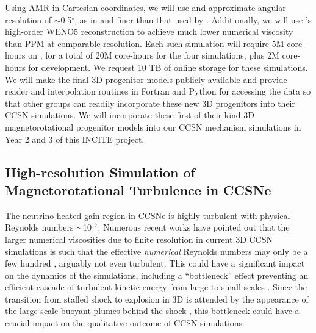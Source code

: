 Using AMR in Cartesian coordinates, we will use and approximate angular resolution of $\sim$0.5$^\circ$, as in \citep{Couch:2015a} and finer than that used by \citep{Muller:2017}.
Additionally, we will use \spark's high-order WENO5 reconstruction to achieve much lower numerical viscosity than PPM at comparable resolution.
Each such simulation will require 5M core-hours on \mira, for a total of 20M core-hours for the four simulations, plus 2M core-hours for development.
We request 10 TB of online storage for these simulations.
We will make the final 3D progenitor models publicly available and provide reader and interpolation routines in Fortran and Python for accessing the data so that other groups can readily incorporate these new 3D progenitors into their CCSN simulations.
We will incorporate these first-of-their-kind 3D magnetorotational progenitor models into our CCSN mechanism simulations in Year 2 and 3 of this INCITE project.

\subsection{High-resolution Simulation of Magnetorotational Turbulence in CCSNe}
\label{sec:Y1hero}

The neutrino-heated gain region in CCSNe is highly turbulent with physical Reynolds numbers $\sim$10$^{17}$.
Numerous recent works have pointed out that the larger numerical viscosities due to finite resolution in current 3D CCSN simulations is such that the effective {\it numerical} Reynolds numbers may only be a few hundred \citep{Couch:2015, Abdikamalov:2015, Radice:2015, Radice:2016}, arguably not even turbulent.
This could have a significant impact on the dynamics of the simulations, including a ``bottleneck'' effect preventing an efficient cascade of turbulent kinetic energy from large to small scales \citep{Hanke:2012, Couch:2013a, Abdikamalov:2015, Radice:2016}.
Since the transition from stalled shock to explosion in 3D is attended by the appearance of the large-scale buoyant plumes behind the shock \citep{Dolence:2013, Muller:2017}, this bottleneck could have a crucial impact on the qualitative outcome of CCSN simulations.

